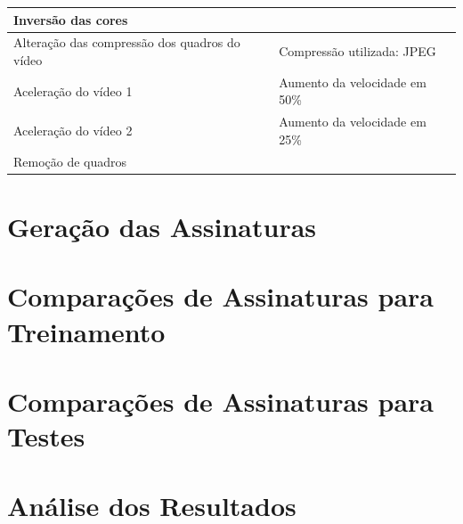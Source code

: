 \begin{table}[h]
\begin{tabular}{ll}
\multicolumn{1}{|l|}{Inversão das cores}                                          & \multicolumn{1}{l|}{}                                                                                                    \\ \hline
\multicolumn{1}{|l|}{Alteração das compressão dos quadros do vídeo}               & \multicolumn{1}{l|}{Compressão utilizada: JPEG}                                                                          \\ \hline
\multicolumn{1}{|l|}{Aceleração do vídeo 1}                                       & \multicolumn{1}{l|}{Aumento da velocidade em 50\%}                                                                       \\ \hline
\multicolumn{1}{|l|}{Aceleração do vídeo 2}                                       & \multicolumn{1}{l|}{Aumento da velocidade em 25\%}                                                                       \\ \hline
Remoção de quadros                                                                &                                                                                                                          \\ \hline
\end{tabular}
\end{table}

\section{Geração das Assinaturas}
\label{sec:met-assinaturas}

\section{Comparações de Assinaturas para Treinamento}
\label{sec:met-comparacao-treinamento}

\section{Comparações de Assinaturas para Testes}
\label{sec:met-comparacao-testes}


\section{Análise dos Resultados}
\label{sec:met-analise}



